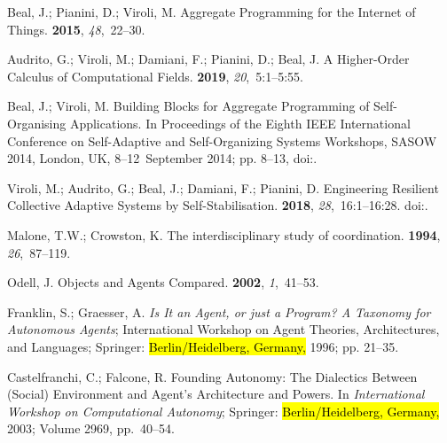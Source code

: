 \documentclass[jsan,article,accept,moreauthors,pdftex]{Definitions/mdpi}
\begin{document}
\begin{thebibliography}{999}
Beal, J.; Pianini, D.; Viroli, M.
\newblock Aggregate Programming for the Internet of Things.
 {\bf 2015}, {\em 48},~22--30.

Audrito, G.; Viroli, M.; Damiani, F.; Pianini, D.; Beal, J.
\newblock A Higher-Order Calculus of Computational Fields.
 {\bf 2019}, {\em 20},~5:1--5:55.

Beal, J.; Viroli, M.
\newblock Building Blocks for Aggregate Programming of Self-Organising
  Applications.
\newblock   In Proceedings of the Eighth {IEEE} International Conference on Self-Adaptive and
  Self-Organizing Systems Workshops, {SASOW} 2014, London, UK, \mbox{8--12
  September} 2014; pp. 8--13,
\newblock
  doi:{\href{https://doi.org/10.1109/SASOW.2014.6}{}}.

Viroli, M.; Audrito, G.; Beal, J.; Damiani, F.; Pianini, D.
\newblock Engineering Resilient Collective Adaptive Systems by
  Self-Stabilisation.
 {\bf 2018}, {\em
  28},~16:1--16:28.
\newblock
  doi:{\href{https://doi.org/10.1145/3177774}{}}.

Malone, T.W.; Crowston, K.
\newblock The interdisciplinary study of coordination.
 {\bf 1994}, {\em 26},~87--119.

Odell, J.
\newblock Objects and Agents Compared.
 {\bf 2002}, {\em 1},~41--53.

Franklin, S.; Graesser, A.
\newblock \emph{Is It an Agent, or just a Program? A Taxonomy for Autonomous Agents};
\newblock  International Workshop on Agent Theories, Architectures, and
  Languages; Springer:  \hl{Berlin/Heidelberg, Germany,} %
  1996; pp. 21--35.

Castelfranchi, C.; Falcone, R.
\newblock Founding Autonomy: The Dialectics Between (Social) Environment and
  Agent's Architecture and Powers.
\newblock  In \emph{International Workshop on Computational Autonomy}; Springer: \hl{Berlin/Heidelberg, Germany,}  2003; Volume 2969,  pp.~40--54.


\end{thebibliography}
\end{document}
